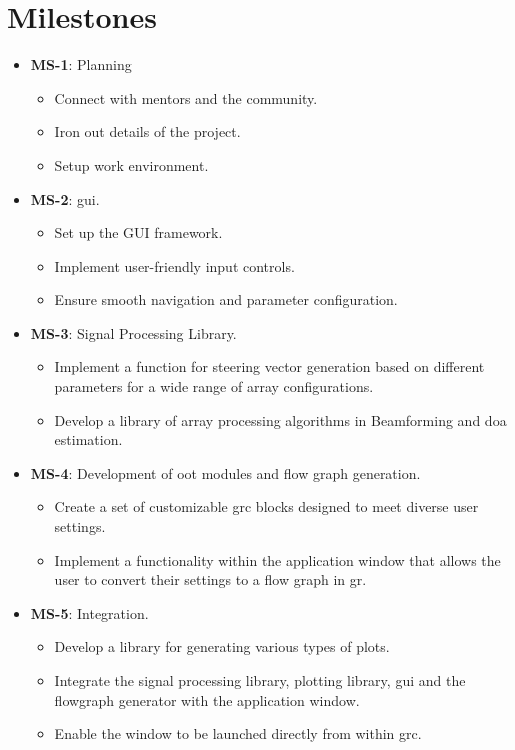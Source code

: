 \section{Milestones} \label{sec: milestones}

\begin{itemize}
	\item \textbf{MS-1}: Planning
	\begin{itemize}
		\item Connect with mentors and the community.
		\item Iron out details of the project.
		\item Setup work environment.
	\end{itemize}
	\item \textbf{MS-2}: \acf{gui}.
	\begin{itemize}
		\item Set up the GUI framework.
		\item Implement user-friendly input controls.
		\item Ensure smooth navigation and parameter configuration.
	\end{itemize}
	\item \textbf{MS-3}: Signal Processing Library.
	\begin{itemize}
		\item Implement a function for steering vector generation based on different parameters for a wide range of array configurations.
		\item Develop a library of array processing algorithms in Beamforming and \ac{doa} estimation.
	\end{itemize}
	\item \textbf{MS-4}: Development of \ac{oot} modules and flow graph generation.
	\begin{itemize}
		\item Create a set of customizable \ac{grc} blocks designed to meet diverse user settings.
		\item Implement a functionality within the application window that allows the user to convert their settings to a flow graph in \acl{gr}.
	\end{itemize}
		\item \textbf{MS-5}: Integration.
	\begin{itemize}
		\item Develop a library for generating various types of plots.
		\item Integrate the signal processing library, plotting library, \ac{gui} and the flowgraph generator with the application window.
		\item Enable the window to be launched directly from within \ac{grc}.
	\end{itemize}
\end{itemize}

